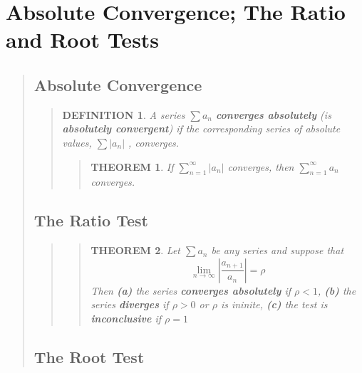 \documentclass{report}
\newtheorem{theorem}{THEOREM}
\newtheorem*{definition}{DEFINITION}
\begin{document}
\section{Absolute Convergence; The Ratio and Root Tests }
\begin{quote}

		\subsection{Absolute Convergence}
		\begin{quote}

			\begin{definition}
				A series $\sum a_n$ \textbf{converges absolutely} (is \textbf{absolutely convergent})  if the corresponding series of absolute values, $\sum \left | a_n \right |$ , converges.
			\end{definition}

			\begin{quote}

				\begin{theorem}
					If $\sum_{n=1}^{\infty} \left | a_n \right | $ converges, then $ \sum_{n=1}^{\infty} a_n $ converges.
				\end{theorem}

			\end{quote}

		\end{quote}

	\subsection{The Ratio Test}
	\begin{quote}

		\begin{quote}
		\begin{theorem}
			Let $ \sum a_n $ be any series and suppose that
			$$\lim_{n \to \infty} \left | \frac{a_{n+1}}{a_n} \right | = \rho $$
			Then \textbf{(a)} the series \textbf{converges absolutely} if $\rho < 1$, \textbf{(b)} the series \textbf{diverges} if $ \rho > 0 $ or $\rho$ is ininite, \textbf{(c)} the test is \textbf{inconclusive} if $\rho = 1$
		\end{theorem}
		\end{quote}

	\end{quote}

	\subsection{The Root Test}
	\begin{quote}


\end{quote}
\end{quote}
\end{document}
